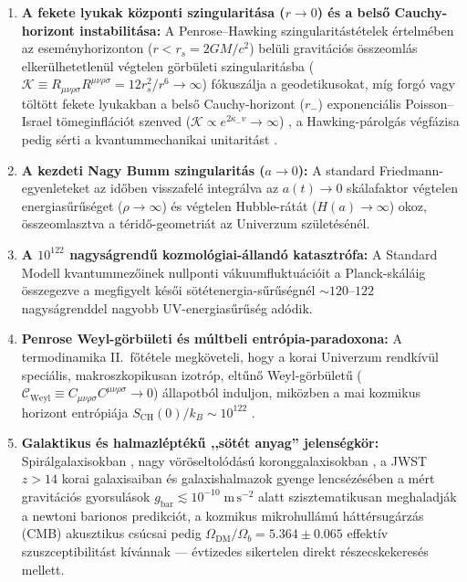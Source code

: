 \documentclass[11pt,a4paper]{article}
\theoremstyle{remark}
\begin{document}
\begin{enumerate}
  \item \textbf{A fekete lyukak k\"ozponti szingularit\'asa ($r \to 0$) \'es a bels\H{o} Cauchy-horizont instabilit\'asa:} A Penrose--Hawking szingularit\'ast\'etelek \cite{Penrose1965Singularity,HawkingEllis1973} \'ertelm\'eben az esem\'enyhorizonton ($r < r_s = 2GM/c^2$) bel\"uli gravit\'aci\'os \"osszeoml\'as elker\"ulhetetlen\"ul v\'egtelen g\"orb\"uleti szingularit\'asba ($\mathcal{K} \equiv R_{\mu\nu\rho\sigma}R^{\mu\nu\rho\sigma} = 12r_s^2/r^6 \to \infty$) f\'okusz\'alja a geodetikusokat, m\'ig forg\'o vagy t\"olt\"ott fekete lyukakban a bels\H{o} Cauchy-horizont ($r_-$) exponenci\'alis Poisson--Israel t\"omeginfl\'aci\'ot szenved ($\mathcal{K} \propto e^{2\kappa_- v} \to \infty$) \cite{PoissonIsrael1990}, a Hawking-p\'arolg\'as v\'egf\'azisa pedig s\'erti a kvantummechanikai unitarit\'ast \cite{Hawking1975,Page1993}.
  \item \textbf{A kezdeti Nagy Bumm szingularit\'as ($a \to 0$):} A standard Friedmann-egyenleteket az id\H{o}ben visszafel\'e integr\'alva az $a(t) \to 0$ sk\'alafaktor v\'egtelen energias\H{u}r\H{u}s\'eget ($\rho \to \infty$) \'es v\'egtelen Hubble-r\'at\'at ($H(a) \to \infty$) okoz, \"osszeomlasztva a t\'erid\H{o}-geometri\'at az Univerzum sz\"ulet\'es\'en\'el.
  \item \textbf{A $10^{122}$ nagys\'agrend\H{u} kozmol\'ogiai-\'alland\'o katasztr\'ofa:} A Standard Modell kvantummez\H{o}inek nullponti v\'akuumfluktu\'aci\'oit a Planck-sk\'al\'aig \"osszegezve a megfigyelt k\'es\H{o}i s\"ot\'etenergia-s\H{u}r\H{u}s\'egn\'el $\sim 120$--$122$ nagys\'agrenddel nagyobb UV-energias\H{u}r\H{u}s\'eg ad\'odik.
  \item \textbf{Penrose Weyl-g\"orb\"uleti \'es m\'ultbeli entr\'opia-paradoxona:} A termodinamika II.\ f\H{o}t\'etele megk\"oveteli, hogy a korai Univerzum rendk\'iv\"ul speci\'alis, makroszkopikusan izotr\'op, elt\H{u}n\H{o} Weyl-g\"orb\"ulet\H{u} ($\mathcal{C}_{\mathrm{Weyl}} \equiv C_{\mu\nu\rho\sigma}C^{\mu\nu\rho\sigma} \to 0$) \'allapotb\'ol induljon, mik\"ozben a mai kozmikus horizont entr\'opi\'aja $S_{\mathrm{CH}}(0)/k_B \sim 10^{122}$ \cite{Penrose1979Weyl,GibbonsHawking1977}.
  \item \textbf{Galaktikus \'es halmazl\'ept\'ek\H{u} ,,s\"ot\'et anyag'' jelens\'egk\"or:} Spir\'algalaxisokban \cite{Milgrom1983}, nagy v\"or\"oseltol\'od\'as\'u koronggalaxisokban \cite{ManceraPina2025}, a JWST $z > 14$ korai galaxisaiban \cite{Carniani2024JADESz14} \'es galaxishalmazok gyenge lencs\'ez\'es\'eben \cite{EuclidOverview2025} a m\'ert gravit\'aci\'os gyorsul\'asok $g_{\mathrm{bar}} \lesssim 10^{-10}\;\mathrm{m\,s^{-2}}$ alatt szisztematikusan meghaladj\'ak a newtoni barionos predikci\'ot, a kozmikus mikrohull\'am\'u h\'att\'ersug\'arz\'as (CMB) akusztikus cs\'ucsai pedig $\Omega_{\mathrm{DM}}/\Omega_b = 5.364 \pm 0.065$ effekt\'iv szuszceptibilit\'ast k\'iv\'annak \cite{Planck2018VI} --- \'evtizedes sikertelen direkt r\'eszecskekeres\'es mellett.

\end{enumerate}
\end{document}
